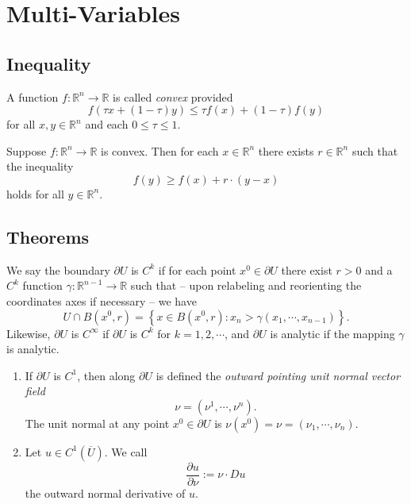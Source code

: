 

\section{Multi-Variables}

\subsection{Inequality}

\begin{definition}
  \label{definition-convex}
  A function \( f: \mathbb{R}^n \to \mathbb{R} \) is called \emph{convex} provided
  \[
    f(\tau x + (1 - \tau) y) \leq \tau f(x) + (1 - \tau) f(y)
  \]
  for all \( x, y \in \mathbb{R}^n \) and each \( 0 \leq \tau \leq 1 \).
\end{definition}

\begin{theorem}
  \label{theorem-supporting-hyperplanes}
  Suppose \( f: \mathbb{R}^n \to \mathbb{R} \) is convex.
  Then for each \( x \in \mathbb{R}^n \) there exists \( r \in \mathbb{R}^n \) such that the inequality
  \[
    f(y) \geq f(x) + r \cdot (y - x)
  \]
  holds for all \( y \in \mathbb{R}^n \).
\end{theorem}

\subsection{Theorems}

\begin{definition}
  \label{definition-boundary-differential}
  We say the boundary \( \partial U \) is \( C^k \) if for each point \( x^0 \in \partial U \) there exist \( r > 0 \) and a \( C^k \) function \( \gamma: \mathbb{R}^{n - 1} \to \mathbb{R} \) such that -- upon relabeling and reorienting the coordinates axes if necessary -- we have
  \[
    U \cap B(x^0, r) = \left\lbrace x \in B(x^0, r): x_n > \gamma(x_1, \cdots, x_{n - 1}) \right\rbrace.
  \]
  Likewise, \( \partial U \) is \( C^\infty \) if \( \partial U \) is \( C^k \) for \( k = 1, 2, \cdots \), and \( \partial U \) is analytic if the mapping \( \gamma \) is analytic.
\end{definition}

\begin{definition}
  \label{definition-outward-pointing-unit-normal-vector-field}
  \begin{enumerate}
    \item If \( \partial U \) is \( C^1 \), then along \( \partial U \) is defined the \emph{outward pointing unit normal vector field}
      \[
        \nu = (\nu^1, \cdots, \nu^n).
      \]
      The unit normal at any point \( x^0 \in \partial U \) is \( \nu (x^0) = \nu = (\nu_1, \cdots, \nu_n) \).
    \item Let \( u \in C^1(\overline{U}) \).
      We call
      \[
        \frac{\partial u}{\partial \nu} := \nu \cdot D u
      \]
      the outward normal derivative of \( u \).
  \end{enumerate}
\end{definition}

